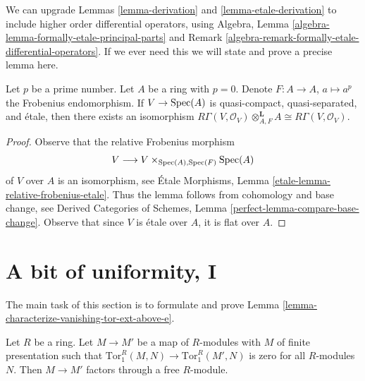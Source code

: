 \begin{remark}
\label{remark-higher-order-operators}
We can upgrade Lemmas \ref{lemma-derivation} and \ref{lemma-etale-derivation}
to include higher order differential operators, using
Algebra, Lemma \ref{algebra-lemma-formally-etale-principal-parts} and
Remark \ref{algebra-remark-formally-etale-differential-operators}.
If we ever need this we will state and prove a
precise lemma here.
\end{remark}

\begin{lemma}
\label{lemma-etale-frobenius}
Let $p$ be a prime number. Let $A$ be a ring with $p = 0$.
Denote $F : A \to A$, $a \mapsto a^p$ the Frobenius endomorphism.
If $V \to \mathop{\mathrm{Spec}}(A)$ is quasi-compact, quasi-separated,
and \'etale, then there exists an isomorphism
$R\Gamma(V, \mathcal{O}_V) \otimes_{A, F}^\mathbf{L} A \cong
R\Gamma(V, \mathcal{O}_V)$.
\end{lemma}

\begin{proof}
Observe that the relative Frobenius morphism
$$
V \longrightarrow V \times_{\mathop{\mathrm{Spec}}(A), \mathop{\mathrm{Spec}}(F)} \mathop{\mathrm{Spec}}(A)
$$
of $V$ over $A$ is an isomorphism, see
\'Etale Morphisms, Lemma \ref{etale-lemma-relative-frobenius-etale}.
Thus the lemma follows from cohomology and base change, see
Derived Categories of Schemes, Lemma
\ref{perfect-lemma-compare-base-change}.
Observe that since $V$ is \'etale over $A$, it is flat over $A$.
\end{proof}





\section{A bit of uniformity, I}
\label{section-uniform-vanishing}

\noindent
The main task of this section is to formulate and prove
Lemma \ref{lemma-characterize-vanishing-tor-ext-above-e}.

\begin{lemma}
\label{lemma-map-tor-1-zero}
Let $R$ be a ring. Let $M \to M'$ be a map of $R$-modules with
$M$ of finite presentation
such that $\text{Tor}_1^R(M, N) \to \text{Tor}_1^R(M', N)$ is zero for all
$R$-modules $N$. Then $M \to M'$ factors through a free $R$-module.
\end{lemma}

